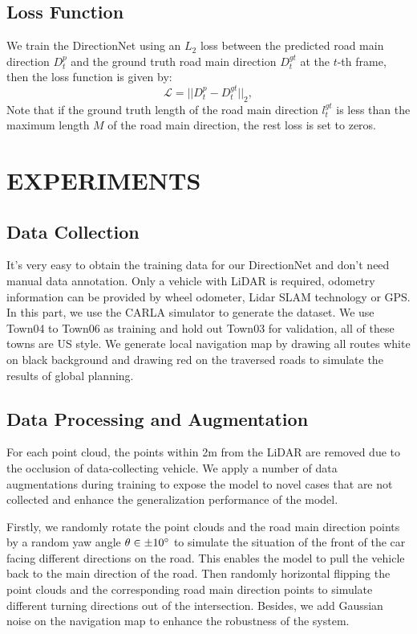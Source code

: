 \documentclass[letterpaper,10 pt,conference]{ieeeconf}  %
\begin{document}
\subsection{Loss Function}
We train the DirectionNet using an $L_2$ loss between the predicted road main direction $D_t^p$ and the ground truth road main direction $D_t^{gt}$ at the $t$-th frame, then the loss function is given by:
\begin{equation}
    \mathcal{L}=||D_t^p-D_t^{gt}||_2, 
\end{equation}
Note that if the ground truth length of the road main direction $l_t^{gt}$ is less than the maximum length $M$ of the road main direction, the rest loss is set to zeros.

\section{EXPERIMENTS}\label{experiments}

\subsection{Data Collection}
It's very easy to obtain the training data for our DirectionNet and don't need manual data annotation. Only a vehicle with LiDAR is required, odometry information can be provided by wheel odometer, Lidar SLAM technology or GPS. In this part, we use the CARLA\cite{CARLA} simulator to generate the dataset. We use Town04 to Town06 as training and hold out Town03 for validation, all of these towns are US style. We generate local navigation map by drawing all routes white on black background and drawing red on the traversed roads to simulate the results of global planning.

\subsection{Data Processing and Augmentation}

For each point cloud, the points within 2m from the LiDAR are removed due to the occlusion of data-collecting vehicle. We apply a number of data augmentations during training to expose the model to novel cases that are not collected and enhance the generalization performance of the model.

Firstly, we randomly rotate the point clouds and the road main direction points by a random yaw angle $\theta \in\pm10 \degree$ to simulate the situation of the front of the car facing different directions on the road. This enables the model to pull the vehicle back to the main direction of the road. Then randomly horizontal flipping the point clouds and the corresponding road main direction points to simulate different turning directions out of the intersection. Besides, we add Gaussian noise on the navigation map to enhance the robustness of the system.
\end{document}
